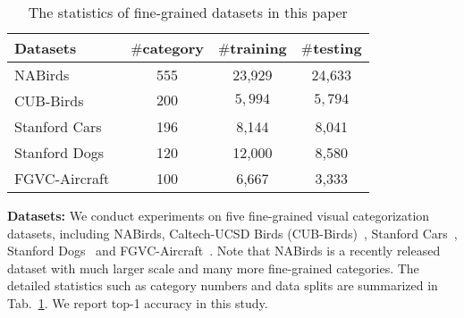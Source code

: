 \documentclass[10pt,twocolumn,letterpaper]{article}
\begin{document}
\begin{table}
\small
\begin{center}
\begin{tabular}{|l|c|c|c|}
\hline
Datasets & $\#$category & $\#$training & $\#$testing \\
\hline\hline
NABirds\cite{nabirds15Perona} & 555 & 23,929 &24,633\\
\hline
CUB-Birds~\cite{cubbirds11caltech} & $200$ & $5,994$ & $5,794$ \\
\hline
Stanford Cars~\cite{stcars13feifei} & 196 & 8,144 &8,041 \\
\hline
Stanford Dogs~\cite{stdogs11feifei} & 120 & 12,000 &8,580\\
\hline
FGVC-Aircraft~\cite{vggaircraft13Vedaldi} & 100 & 6,667 &3,333\\
\hline
\end{tabular}
\end{center}
\caption{The statistics of fine-grained datasets in this paper}
\label{tab:datasets}
\end{table}

\textbf{Datasets:} We conduct experiments on five fine-grained visual categorization datasets, including NABirds\cite{nabirds15Perona}, Caltech-UCSD Birds (CUB-Birds)~\cite{cubbirds11caltech}, Stanford Cars~\cite{stcars13feifei}, Stanford Dogs~\cite{stdogs11feifei} and  FGVC-Aircraft~\cite{vggaircraft13Vedaldi}. Note that NABirds is a recently released dataset with much larger scale and many more  fine-grained categories. The detailed statistics such as category numbers and data splits are summarized in Tab.~\ref{tab:datasets}. We report top-1 accuracy in this study. 
\end{document}
